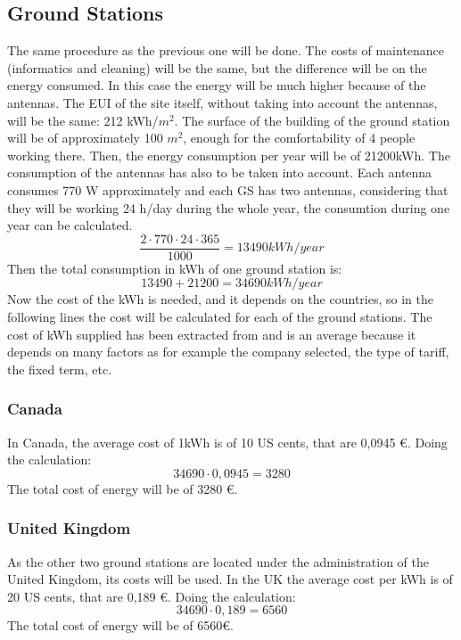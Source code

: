 \documentclass[12pt,a4paper]{report}
\begin{document}
\subsection{Ground Stations}
The same procedure as the previous one will be done. The costs of maintenance (informatics and cleaning) will be the same, but the difference will be on the energy consumed. In this case the energy will be much higher because of the antennas. The EUI of the site itself, without taking into account the antennas, will be the same: 212 kWh/$m^2$. The surface of the building of the ground station will be of approximately 100 $m^2$, enough for the comfortability of 4 people working there. Then, the energy consumption per year will be of 21200kWh. The consumption of the antennas has also to be taken into account. Each antenna consumes 770 W approximately and each GS has two antennas, considering that they will be working 24 h/day during the whole year, the consumtion during one year can be calculated.
\begin{equation}
\frac{2 \cdot 770 \cdot 24 \cdot 365}{1000}=13490 kWh/year 
\end{equation}
Then the total consumption in kWh of one ground station is:
\begin{equation}
13490+21200=34690kWh/year
\end{equation}
Now the cost of the kWh is needed, and it depends on the countries, so in the following lines the cost will be calculated for each of the ground stations. The cost of kWh supplied has been extracted from \cite{OVO} and is an average because it depends on many factors as for example the company selected, the type of tariff, the fixed term, etc. 
\subsubsection{Canada}
In Canada, the average cost of 1kWh is of 10 US cents, that are 0,0945 \euro. Doing the calculation:
\begin{equation}
34690\cdot 0,0945= 3280
\end{equation}
The total cost of energy will be of 3280 \euro.
\subsubsection{United Kingdom}
As the other two ground stations are located under the administration of the United Kingdom, its costs will be used. In the UK the average cost per kWh is of 20 US cents, that are 0,189 \euro. Doing the calculation: 
  \begin{equation}
34690\cdot 0,189= 6560
\end{equation}
The total cost of energy will be of 6560\euro. 
\end{document}
